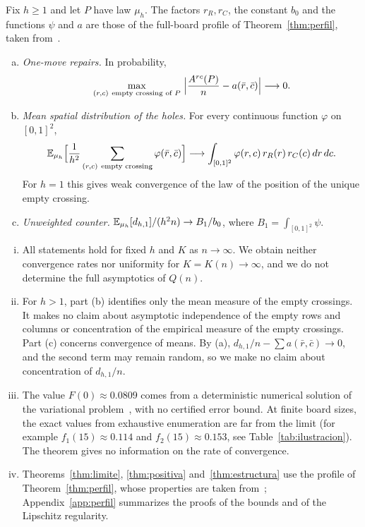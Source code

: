 \begin{teorema}\label{thm:estructura} Fix $h\ge1$ and let $P$ have law $\mu_h$. The
factors $r_R,r_C$, the
constant $b_0$ and the functions $\psi$ and $a$ are those of the full-board profile of
Theorem~\ref{thm:perfil}, taken
from~\cite{Perfil}. \begin{enumerate}[(a)] \item
\emph{One-move repairs.} In probability, \[
 \max_{(r,c)\ \text{empty crossing of }P}\ \Bigl|\frac{A^{rc}(P)}{n}-a(\bar r,\bar c)\Bigr|\longrightarrow0
.
\] \item \emph{Mean spatial distribution of the holes.} For every continuous function $\varphi$ on
$[0,1]^2$, \[
 \E_{\mu_h}\Bigl[\frac1{h^2}\sum_{(r,c)\ \text{empty crossing}}\varphi(\bar r,\bar c)\Bigr]
 \longrightarrow\int_{[0,1]^2}\varphi(r,c)\,r_R(r)\,r_C(c)\,dr\,dc .
\] For $h=1$ this gives weak convergence of the law of the position of the unique empty crossing. \item
\emph{Unweighted counter.}
$\mathbb{E}_{\mu_h}[d_{h,1}]/(h^2n)\to B_1/b_0$, where $B_1=\int_{[0,1]^2}\psi$. \end{enumerate} \end{teorema}

\begin{observacion}[Scope]\label{obs:alcance} \begin{enumerate}[(i)] \item All statements hold for fixed $h$
and $K$ as $n\to\infty$.
We obtain neither convergence rates nor uniformity for $K=K(n)\to\infty$, and we do not determine the full
asymptotics of $Q(n)$. \item
For $h>1$, part (b) identifies only the mean measure of the empty crossings. It makes no claim about
asymptotic independence of the
empty rows and columns or concentration of the empirical measure of the empty crossings. Part (c) concerns
convergence of means. By
(a), $d_{h,1}/n-\sum a(\bar r,\bar c)\to0$, and the second term may remain random, so we make no claim about
concentration of
$d_{h,1}/n$. \item The value $F(0)\approx0.0809$ comes from a deterministic numerical solution of the
variational
problem~\cite[Section~9]{Perfil}, with no certified error bound. At finite board sizes, the exact values
from exhaustive enumeration
are far from the limit (for example $f_1(15)\approx0.114$ and $f_2(15)\approx0.153$, see
Table~\ref{tab:ilustracion}). The theorem
gives no information on the rate of convergence. \item Theorems~\ref{thm:limite}, \ref{thm:positiva}
and~\ref{thm:estructura} use the profile of Theorem~\ref{thm:perfil}, whose properties are taken
from~\cite{Perfil};
Appendix~\ref{app:perfil} summarizes the proofs of the bounds and of the Lipschitz regularity.
\end{enumerate} \end{observacion}

